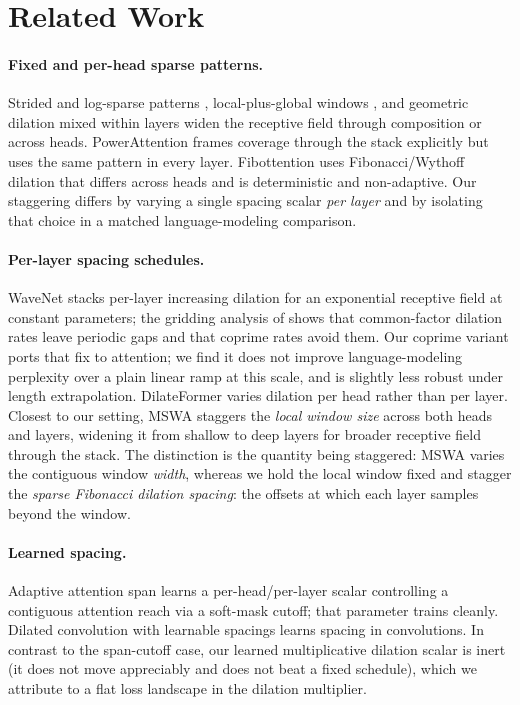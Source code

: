 \documentclass[11pt]{article}
\begin{document}
\section{Related Work}
\label{sec:related}

\paragraph{Fixed and per-head sparse patterns.}
Strided and log-sparse patterns \citep{child2019sparse}, local-plus-global
windows \citep{beltagy2020longformer,zaheer2020bigbird}, and geometric dilation
mixed within layers \citep{ding2023longnet} widen the receptive field through
composition or across heads. PowerAttention \citep{powerattention2025} frames
coverage through the stack explicitly but uses the same pattern in every layer.
Fibottention \citep{fibottention2024} uses Fibonacci/Wythoff dilation that differs
across heads and is deterministic and non-adaptive. Our staggering differs by
varying a single spacing scalar \emph{per layer} and by isolating that choice in a
matched language-modeling comparison.

\paragraph{Per-layer spacing schedules.}
WaveNet \citep{oord2016wavenet} stacks per-layer increasing dilation for an
exponential receptive field at constant parameters; the gridding analysis of
\citet{wang2018understanding} shows that common-factor dilation rates leave
periodic gaps and that coprime rates avoid them. Our coprime variant ports that
fix to attention; we find it does not improve language-modeling perplexity over a
plain linear ramp at this scale, and is slightly less robust under length
extrapolation. DilateFormer \citep{jiao2023dilateformer} varies dilation per head
rather than per layer. Closest to our setting, MSWA \citep{xu2025mswa} staggers
the \emph{local window size} across both heads and layers, widening it from
shallow to deep layers for broader receptive field through the stack. The
distinction is the quantity being staggered: MSWA varies the contiguous window
\emph{width}, whereas we hold the local window fixed and stagger the
\emph{sparse Fibonacci dilation spacing}: the offsets at which each layer
samples beyond the window.

\paragraph{Learned spacing.}
Adaptive attention span \citep{sukhbaatar2019adaptive} learns a per-head/per-layer
scalar controlling a contiguous attention reach via a soft-mask cutoff; that
parameter trains cleanly. Dilated convolution with learnable spacings
\citep{khalfaoui2023dcls} learns spacing in convolutions. In contrast to the
span-cutoff case, our learned multiplicative dilation scalar is inert (it does
not move appreciably and does not beat a fixed schedule), which we attribute to a
flat loss landscape in the dilation multiplier.
\end{document}
